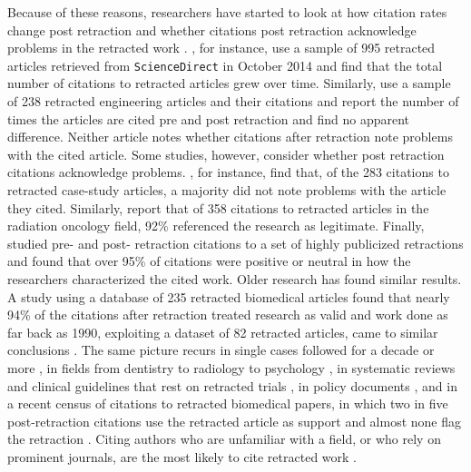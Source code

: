 \documentclass[11pt,letterpaper]{article}
\begin{document}
Because of these reasons, researchers have started to look at how citation rates change post retraction \citep{bar2018temporal, rubbo2019citation} and whether citations post retraction acknowledge problems in the retracted work \citep[e.g.,][]{bar2017post, hamilton2019continued, luwel2018schon}. \citet{bar2018temporal}, for instance, use a sample of 995 retracted articles retrieved from \texttt{ScienceDirect} in October 2014 and find that the total number of citations to retracted articles grew over time. Similarly, \citet{rubbo2019citation} use a sample of 238 retracted engineering articles and their citations and report the number of times the articles are cited pre and post retraction and find no apparent difference. Neither article notes whether citations after retraction note problems with the cited article. Some studies, however, consider whether post retraction citations acknowledge problems. \citet{bar2017post}, for instance, find that, of the 283 citations to retracted case-study articles, a majority did not note problems with the article they cited. Similarly, \citet{hamilton2019continued} report that of 358 citations to retracted articles in the radiation oncology field, 92\% referenced the research as legitimate. Finally, \citet{luwel2018schon} studied pre- and post- retraction citations to a set of highly publicized retractions and found that over 95\% of citations were positive or neutral in how the researchers characterized the cited work. Older research has found similar results. A study using a database of 235 retracted biomedical articles found that nearly 94\% of the citations after retraction treated research as valid \citep{budd1998phenomena} and work done as far back as 1990, exploiting a dataset of 82 retracted articles, came to similar conclusions \citep{pfeifer1990continued}. The same picture recurs in single cases followed for a decade or more \citep{bornemanncimenti2016perpetuation, schneider2020continued, suelzer2019assessment, heibi2021qualitative}, in fields from dentistry to radiology to psychology \citep{theismahon2020continued, rapani2020retracted, bolboaca2019post, morisfernandez2019retracted, dinh2019systematic}, in systematic reviews and clinical guidelines that rest on retracted trials \citep{avenell2019investigation, bolland2021citation, kataoka2022retracted}, in policy documents \citep{malkov2023spread}, and in a recent census of citations to retracted biomedical papers, in which two in five post-retraction citations use the retracted article as support and almost none flag the retraction \citep{joseph2026retracted}. Citing authors who are unfamiliar with a field, or who rely on prominent journals, are the most likely to cite retracted work \citep{hsiao2021, woo2024}.
\end{document}
